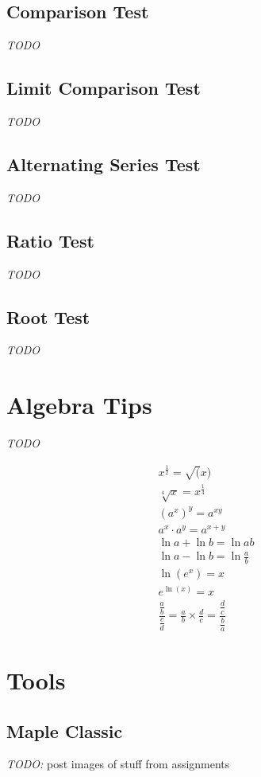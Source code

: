 \documentclass[8pt,letterpaper]{article}
\begin{document}
\subsection*{Comparison Test}
\emph{TODO}
\subsection*{Limit Comparison Test} %
\emph{TODO}
\subsection*{Alternating Series Test}
\emph{TODO}
\subsection*{Ratio Test} %
\emph{TODO}
\subsection*{Root Test}
\emph{TODO}

\section{Algebra Tips} %
\emph{TODO}

\begin{eqnarray*} %
x^{\frac{1}{2}} = \sqrt(x) \\
\sqrt[4]{x} = x^{\frac{1}{4}} \\
(a^x)^y = a^{xy} \\
a^x \cdot a^y = a^{x+y} \\
\ln a + \ln b = \ln ab \\
\ln a - \ln b = \ln \frac{a}{b} \\
\ln(e^x) = x \\
e^{\ln(x)} = x \\
\dfrac{\frac{a}{b}}{\frac{c}{d}} = \frac{a}{b} \times \frac{d}{c} = \dfrac{\frac{d}{c}}{\frac{b}{a}}
\end{eqnarray*}
  

\section{Tools}
\subsection*{Maple Classic}
\emph{TODO:} post images of stuff from assignments
\end{document}
